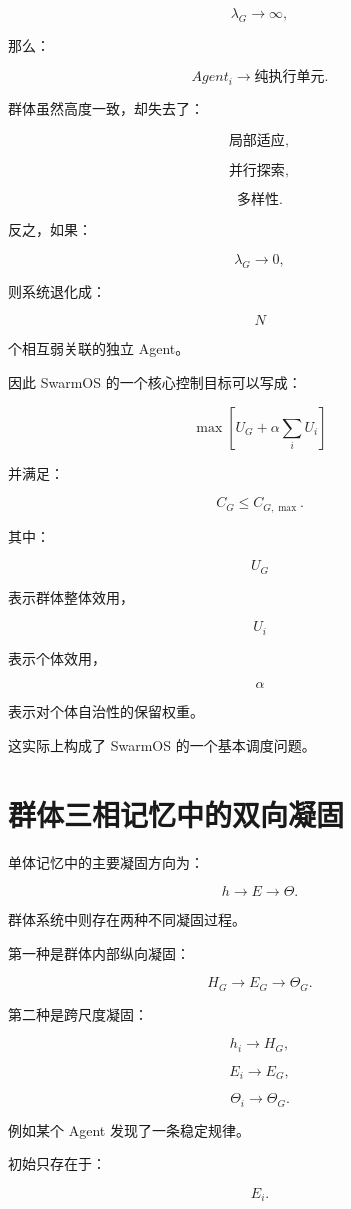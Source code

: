 \[
\lambda_G
\rightarrow
\infty,
\]

那么：

\[
Agent_i
\rightarrow
\text{纯执行单元}.
\]

群体虽然高度一致，却失去了：

\[
\text{局部适应},
\]

\[
\text{并行探索},
\]

\[
\text{多样性}.
\]

反之，如果：

\[
\lambda_G
\rightarrow
0,
\]

则系统退化成：

\[
N
\]

个相互弱关联的独立 Agent。

因此 SwarmOS 的一个核心控制目标可以写成：

\[
\max
\left[
U_G
+
\alpha
\sum_iU_i
\right]
\]

并满足：

\[
C_G
\leq
C_{G,\max}.
\]

其中：

\[
U_G
\]

表示群体整体效用，

\[
U_i
\]

表示个体效用，

\[
\alpha
\]

表示对个体自治性的保留权重。

这实际上构成了 SwarmOS 的一个基本调度问题。


\section{群体三相记忆中的双向凝固}

单体记忆中的主要凝固方向为：

\[
h
\rightarrow
E
\rightarrow
\Theta.
\]

群体系统中则存在两种不同凝固过程。

第一种是群体内部纵向凝固：

\[
H_G
\rightarrow
E_G
\rightarrow
\Theta_G.
\]

第二种是跨尺度凝固：

\[
h_i
\rightarrow
H_G,
\]

\[
E_i
\rightarrow
E_G,
\]

\[
\Theta_i
\rightarrow
\Theta_G.
\]

例如某个 Agent 发现了一条稳定规律。

初始只存在于：

\[
E_i.
\]

